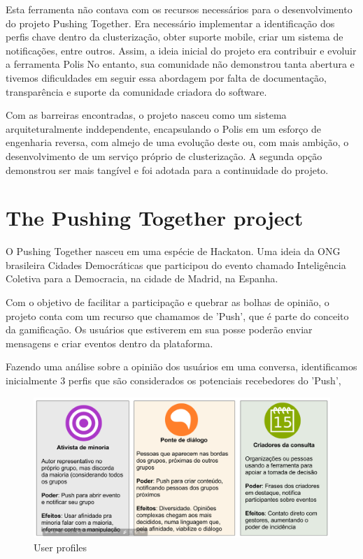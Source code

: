 \documentclass{llncs}
\begin{document}
 Esta ferramenta não contava com os recursos necessários para o desenvolvimento
 do projeto Pushing Together. Era necessário implementar a identificação dos perfis
 chave dentro da clusterização, obter suporte mobile, criar um sistema de notificações,
 entre outros. Assim, a ideia inicial do projeto era contribuir e evoluir a ferramenta Polis
 No entanto, sua comunidade não demonstrou tanta abertura e tivemos dificuldades
 em seguir essa abordagem por falta de documentação, transparência e suporte da
 comunidade criadora do software.

 Com as barreiras encontradas, o projeto nasceu como um sistema arquiteturalmente
 inddependente, encapsulando o Polis em um esforço de engenharia reversa,
 com almejo de uma evolução deste ou, com mais ambição, o desenvolvimento de um serviço próprio
 de clusterização. A segunda opção demonstrou ser mais tangível e foi adotada
 para a continuidade do projeto.

\section{The Pushing Together project}
\label{sec:mezuro}

O Pushing Together nasceu em uma espécie de Hackaton. Uma
ideia da ONG brasileira Cidades Democráticas que participou do evento chamado Inteligência Coletiva
para a Democracia, na cidade de Madrid, na Espanha.

Com o objetivo de facilitar a participação e quebrar as bolhas de opinião,
o projeto conta com um recurso que chamamos de 'Push', que é parte do conceito
da gamificação. Os usuários que estiverem em sua posse poderão enviar mensagens
e criar eventos dentro da plataforma.

Fazendo uma análise sobre a opinião dos usuários em uma conversa, identificamos
inicialmente 3 perfis que são considerados os potenciais recebedores do 'Push',

\begin{figure}[H]
  \centering
    \includegraphics[keepaspectratio=true,scale=0.25]{images/userprofiles.png}
  \caption{User profiles}
  \label{fig:architecture-2}
\end{figure}
\end{document}
